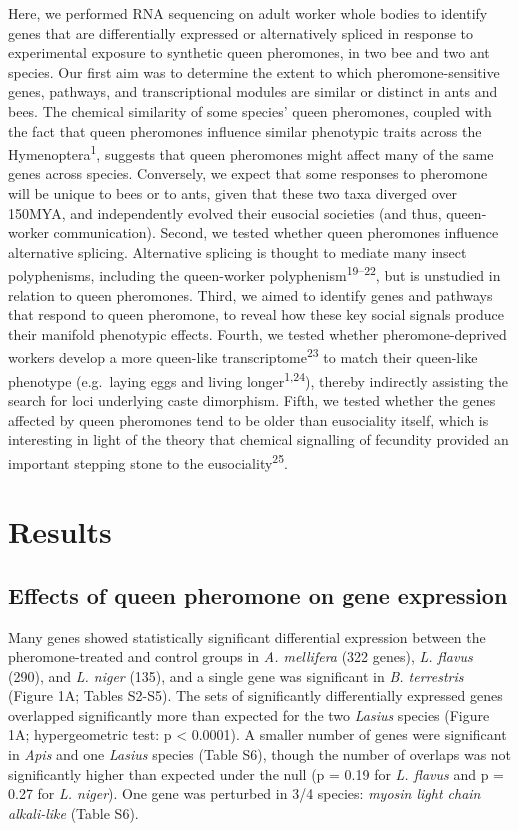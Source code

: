 \documentclass[12pt,]{article}
\begin{document}
Here, we performed RNA sequencing on adult worker whole bodies to
identify genes that are differentially expressed or alternatively
spliced in response to experimental exposure to synthetic queen
pheromones, in two bee and two ant species. Our first aim was to
determine the extent to which pheromone-sensitive genes, pathways, and
transcriptional modules are similar or distinct in ants and bees. The
chemical similarity of some species' queen pheromones, coupled with the
fact that queen pheromones influence similar phenotypic traits across
the Hymenoptera\textsuperscript{1}, suggests that queen pheromones might
affect many of the same genes across species. Conversely, we expect that
some responses to pheromone will be unique to bees or to ants, given
that these two taxa diverged over 150MYA, and independently evolved
their eusocial societies (and thus, queen-worker communication). Second,
we tested whether queen pheromones influence alternative splicing.
Alternative splicing is thought to mediate many insect polyphenisms,
including the queen-worker polyphenism\textsuperscript{19--22}, but is
unstudied in relation to queen pheromones. Third, we aimed to identify
genes and pathways that respond to queen pheromone, to reveal how these
key social signals produce their manifold phenotypic effects. Fourth, we
tested whether pheromone-deprived workers develop a more queen-like
transcriptome\textsuperscript{23} to match their queen-like phenotype
(e.g.~laying eggs and living longer\textsuperscript{1,24}), thereby
indirectly assisting the search for loci underlying caste dimorphism.
Fifth, we tested whether the genes affected by queen pheromones tend to
be older than eusociality itself, which is interesting in light of the
theory that chemical signalling of fecundity provided an important
stepping stone to the eusociality\textsuperscript{25}.

\section{Results}\label{results}

\subsection{Effects of queen pheromone on gene
expression}\label{effects-of-queen-pheromone-on-gene-expression}

Many genes showed statistically significant differential expression
between the pheromone-treated and control groups in \emph{A. mellifera}
(322 genes), \emph{L. flavus} (290), and \emph{L. niger} (135), and a
single gene was significant in \emph{B. terrestris} (Figure 1A; Tables
S2-S5). The sets of significantly differentially expressed genes
overlapped significantly more than expected for the two \emph{Lasius}
species (Figure 1A; hypergeometric test: p \textless{} 0.0001). A
smaller number of genes were significant in \emph{Apis} and one
\emph{Lasius} species (Table S6), though the number of overlaps was not
significantly higher than expected under the null (p = 0.19 for \emph{L.
flavus} and p = 0.27 for \emph{L. niger}). One gene was perturbed in 3/4
species: \emph{myosin light chain alkali-like} (Table S6).
\end{document}
